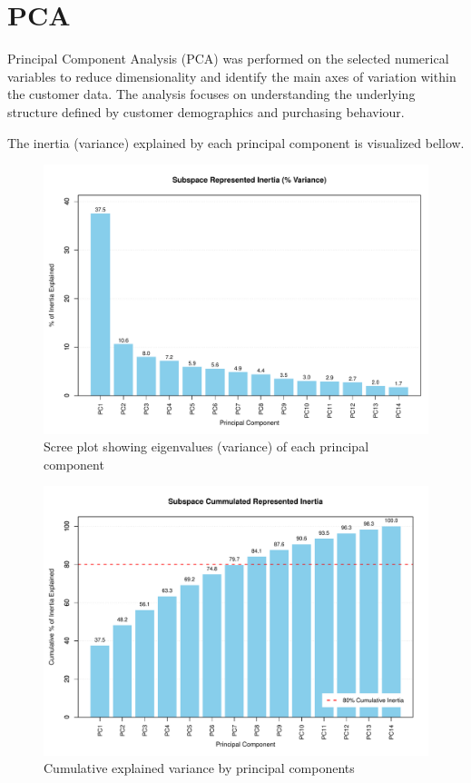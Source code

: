 \raggedright
\section{PCA}
Principal Component Analysis (PCA) was performed on the selected numerical variables to reduce dimensionality and identify the main axes of variation within the customer data. The analysis focuses on understanding the underlying structure defined by customer demographics and purchasing behaviour.

The inertia (variance) explained by each principal component is visualized bellow.

\begin{figure}[H]
    \centering
    \includegraphics[width=0.8\linewidth]{Imatges/represented_inertia_plot.pdf}
    \caption{Scree plot showing eigenvalues (variance) of each principal component}
    \label{fig:scree_plot}
\end{figure}

\begin{figure}[H]
    \centering
    \includegraphics[width=0.8\linewidth]{Imatges/cummulated_inertia_plot.pdf}
    \caption{Cumulative explained variance by principal components}
    \label{fig:cumulative_variance}
\end{figure}

